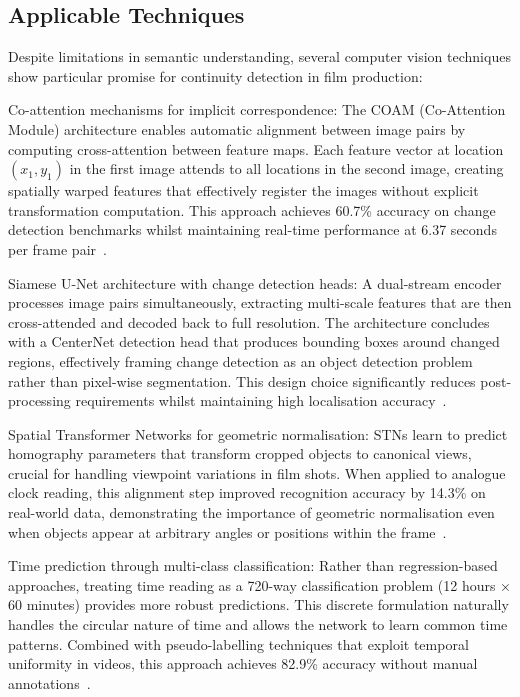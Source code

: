 \subsection{Applicable Techniques}

Despite limitations in semantic understanding, several computer vision techniques show particular promise for continuity detection in film production:

Co-attention mechanisms for implicit correspondence: The COAM (Co-Attention Module) architecture enables automatic alignment between image pairs by computing cross-attention between feature maps. Each feature vector at location $(x_1, y_1)$ in the first image attends to all locations in the second image, creating spatially warped features that effectively register the images without explicit transformation computation. This approach achieves 60.7\% accuracy on change detection benchmarks whilst maintaining real-time performance at 6.37 seconds per frame pair~\cite{zhang2023}.

Siamese U-Net architecture with change detection heads: A dual-stream encoder processes image pairs simultaneously, extracting multi-scale features that are then cross-attended and decoded back to full resolution. The architecture concludes with a CenterNet detection head that produces bounding boxes around changed regions, effectively framing change detection as an object detection problem rather than pixel-wise segmentation. This design choice significantly reduces post-processing requirements whilst maintaining high localisation accuracy~\cite{zhang2023}.

Spatial Transformer Networks for geometric normalisation: STNs learn to predict homography parameters that transform cropped objects to canonical views, crucial for handling viewpoint variations in film shots. When applied to analogue clock reading, this alignment step improved recognition accuracy by 14.3\% on real-world data, demonstrating the importance of geometric normalisation even when objects appear at arbitrary angles or positions within the frame~\cite{ma2024}.

Time prediction through multi-class classification: Rather than regression-based approaches, treating time reading as a 720-way classification problem (12 hours × 60 minutes) provides more robust predictions. This discrete formulation naturally handles the circular nature of time and allows the network to learn common time patterns. Combined with pseudo-labelling techniques that exploit temporal uniformity in videos, this approach achieves 82.9\% accuracy without manual annotations~\cite{ma2024}.

